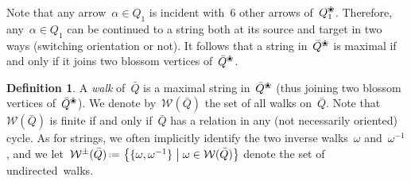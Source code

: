 \documentclass{amsart}
\theoremstyle{definition}
\newtheorem{definition}[theorem]{Definition}
\newcommand{\set}[2]{\left\{ #1 \;\middle|\; #2 \right\}} %
\newcommand{\eqdef}{\mbox{\,\raisebox{0.2ex}{\scriptsize\ensuremath{\mathrm:}}\ensuremath{=}\,}} %
\newcommand{\darkblue}{\color{darkblue}} %
\newcommand{\defn}[1]{\textsl{\darkblue #1}} %
\newcommand{\blossom}{^\text{\ding{96}}} %
\newcommand{\walks}{\mathcal{W}} %
\begin{document}
%

Note that any arrow~$\alpha \in Q_1$ is incident with~$6$ other arrows of~$Q\blossom_1$.
Therefore, any~$\alpha \in Q_1$ can be continued to a string both at its source and target in two ways (switching orientation or not).
It follows that a string in~$\bar Q\blossom$ is maximal if and only if it joins two blossom vertices of~$\bar Q\blossom$.

\begin{definition}
A \defn{walk} of~$\bar Q$ is a maximal string in~$\bar Q\blossom$ (thus joining two blossom vertices of~$\bar Q\blossom$).
We denote by~$\walks(\bar Q)$ the set of all walks on~$\bar Q$.
Note that~$\walks(\bar Q)$ is finite if and only if~$\bar Q$ has a relation in any (not necessarily oriented) cycle.
As for strings, we often implicitly identify the two inverse walks~$\omega$ and~$\omega^{-1}$, and we let~$\walks^\pm(\bar Q) \eqdef \set{\{\omega, \omega^{-1}\}}{\omega \in \walks(\bar Q)}$ denote the set of undirected~walks.
\end{definition}
\end{document}
